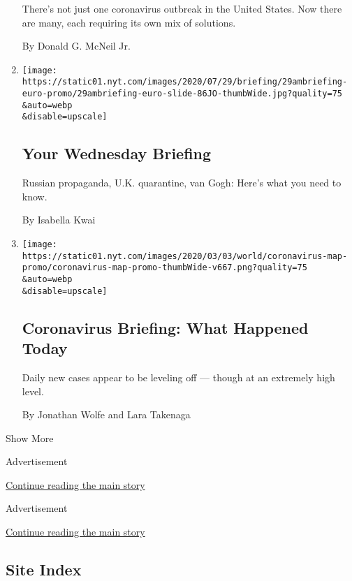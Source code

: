 \begin{enumerate}
  There's not just one coronavirus outbreak in the United States. Now
  there are many, each requiring its own mix of solutions.

  By Donald G. McNeil Jr.
\item
  \href{/2020/07/29/briefing/russian-propaganda-uk-quarantine-van-gogh.html}{}

  \texttt{[image: https://static01.nyt.com/images/2020/07/29/briefing/29ambriefing-euro-promo/29ambriefing-euro-slide-86JO-thumbWide.jpg?quality=75\\\&auto=webp\\\&disable=upscale]}

  \hypertarget{your-wednesday-briefing}{%
  \subsection{Your Wednesday Briefing}\label{your-wednesday-briefing}}

  Russian propaganda, U.K. quarantine, van Gogh: Here's what you need to
  know.

  By Isabella Kwai
\item
  \href{/2020/07/28/us/coronavirus-today.html}{}

  \texttt{[image: https://static01.nyt.com/images/2020/03/03/world/coronavirus-map-promo/coronavirus-map-promo-thumbWide-v667.png?quality=75\\\&auto=webp\\\&disable=upscale]}

  \hypertarget{coronavirus-briefing-what-happened-today}{%
  \subsection{Coronavirus Briefing: What Happened
  Today}\label{coronavirus-briefing-what-happened-today}}

  Daily new cases appear to be leveling off --- though at an extremely
  high level.

  By Jonathan Wolfe and Lara Takenaga
\end{enumerate}

Show More

Advertisement

\protect\hyperlink{after-mid4}{Continue reading the main story}

Advertisement

\protect\hyperlink{after-mktg}{Continue reading the main story}

\hypertarget{site-index}{%
\subsection{Site Index}\label{site-index}}

